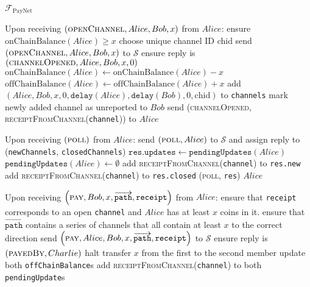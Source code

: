 \begin{functionality}{$\mathcal{F}_{\mathrm{PayNet}}$}
\begin{algorithmic}[1]
    \State Upon receiving $\left(\textsc{openChannel}, Alice, Bob, x\right)$
    from $Alice$:
    \Indent
      \State ensure $\mathrm{onChainBalance}\left(Alice\right) \geq x$
      \State choose unique channel ID chid
      \State send $\left(\textsc{openChannel}, Alice, Bob, x\right)$ to
      $\mathcal{S}$
      \State ensure reply is $\left(\textsc{channelOpened}, Alice, Bob, x,
      0\right)$
      \State $\mathrm{onChainBalance}\left(Alice\right) \gets
      \mathrm{onChainBalance}\left(Alice\right) - x$
      \State $\mathrm{offChainBalance}\left(Alice\right) \gets
      \mathrm{offChainBalance}\left(Alice\right) + x$
      \State add $\left(Alice, Bob, x, 0, \mathtt{delay}\left(Alice\right),
      \mathtt{delay}\left(Bob\right), 0, \mathrm{chid}\right)$ to
      \texttt{channels}
      \State mark newly added channel as unreported to $Bob$
      \State send (\textsc{channelOpened},
      \textsc{receiptFromChannel}(\texttt{channel})) to $Alice$
    \EndIndent
    \State

    \State Upon receiving $\left(\textsc{poll}\right)$ from $Alice$:
    \Indent
      \State send $\left(\textsc{poll}, Alice\right)$ to $\mathcal{S}$
      and assign reply to (\texttt{newChannels}, \texttt{closedChannels})
      \State $\mathtt{res.updates} \gets
      \mathtt{pendingUpdates}\left(Alice\right)$
      \State $\mathtt{pendingUpdates}\left(Alice\right) \gets \emptyset$
        \State add \textsc{receiptFromChannel}(\texttt{channel}) to
        \texttt{res.new}
      \EndFor
        \State add \textsc{receiptFromChannel}(\texttt{channel}) to
        \texttt{res.closed}
      \EndFor
      \State \Return (\textsc{poll}, \texttt{res}) $Alice$
    \EndIndent
    \State

    \State Upon receiving $\left(\textsc{pay}, Bob, x,
    \overrightarrow{\mathtt{path}}, \mathtt{receipt}\right)$ from $Alice$:
    \Indent
      \State ensure that \texttt{receipt} corresponds to an open
      \texttt{channel} and $Alice$ has at least $x$ coins in it.
      \State ensure that $\overrightarrow{\mathtt{path}}$ contains a series of
      channels that all contain at least $x$ to the correct direction
      \State send $\left(\textsc{pay}, Alice, Bob, x,
      \overrightarrow{\mathtt{path}}, \mathtt{receipt}\right)$ to $\mathcal{S}$
      \State ensure reply is $\left(\textsc{payedBy}, Charlie\right)$
        \State halt
      \Else
          \State transfer $x$ from the first to the second member
          \State update both \texttt{offChainBalance}s
          \State add \textsc{receiptFromChannel}(\texttt{channel}) to both
          \texttt{pendingUpdate}s
        \EndFor
      \EndIf
    \EndIndent
    \State


\end{algorithmic}
\end{functionality}
